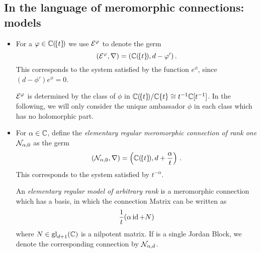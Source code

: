 \subsection{In the language of meromorphic connections: models}
\begin{defn}\label{defn:elemnMerConnBausteine}
  \begin{itemize}
    \item For a $\varphi\in\mathbb{C}(\!\{t\}\!)$ we use $\mathcal{E}^{\varphi}$ to denote the germ
      \[
        (\mathcal{E}^{\varphi},\nabla)=(\mathbb{C}(\!\{t\}\!),d-\varphi')\,.
      \]
      This corresponds to the system satisfied by the function $e^\phi$, since
      $(d-\phi')e^\phi=0$.
      \begin{s-cor}
        $\mathcal{E}^\varphi$ is determined by the class of $\phi$ in
        $\mathbb{C}(\!\{t\}\!)/\mathbb{C}\{t\}\cong t^{-1}\mathbb{C}[t^{-1}]$. In the following, we
        will only consider the unique ambassador $\phi$ in each class which has
        no holomorphic part.
      \end{s-cor}
    \item For $\alpha\in\mathbb{C}$, define the \emph{elementary regular meromorphic
      connection of rank one} $\mathcal{N}_{\alpha,0}$ as the germ
      \[
        (\mathcal{N}_{\alpha,0},\nabla)=\left(\mathbb{C}(\!\{t\}\!),d+\frac{\alpha}{t}\right)
        \,.
      \]
      This corresponds to the system satisfied by $t^{-\alpha}$.

      An \emph{elementary regular model of arbitrary rank} is a meromorphic
      connection which has a basis, in which the connection Matrix can be
      written as
      \[
        \frac{1}{t} (\alpha\operatorname{id}+N)
      \]
      where $N\in\operatorname{gl}_{d+1}(\mathbb{C})$ is a nilpotent matrix.
      If  is a single Jordan Block, we denote the
      corresponding connection by $\mathcal{N}_{\alpha,d}$.
  \end{itemize}
\end{defn}
